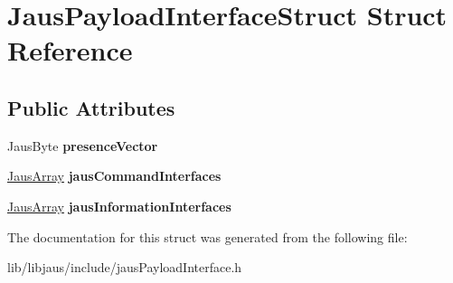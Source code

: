 \hypertarget{struct_jaus_payload_interface_struct}{\section{\-Jaus\-Payload\-Interface\-Struct \-Struct \-Reference}
\label{struct_jaus_payload_interface_struct}
}
\subsection*{\-Public \-Attributes}
\begin{DoxyCompactItemize}
\item 
\hypertarget{struct_jaus_payload_interface_struct_a78fd70aee5416cc2ffef43432e9ff16c}{\-Jaus\-Byte {\bfseries presence\-Vector}}\label{struct_jaus_payload_interface_struct_a78fd70aee5416cc2ffef43432e9ff16c}

\item 
\hypertarget{struct_jaus_payload_interface_struct_a9f2ca1e65ba68281f908d8600fa73711}{\hyperlink{struct_jaus_array_struct}{\-Jaus\-Array} {\bfseries jaus\-Command\-Interfaces}}\label{struct_jaus_payload_interface_struct_a9f2ca1e65ba68281f908d8600fa73711}

\item 
\hypertarget{struct_jaus_payload_interface_struct_a4f484d4a166507f7ebdf120f81f5a7cb}{\hyperlink{struct_jaus_array_struct}{\-Jaus\-Array} {\bfseries jaus\-Information\-Interfaces}}\label{struct_jaus_payload_interface_struct_a4f484d4a166507f7ebdf120f81f5a7cb}

\end{DoxyCompactItemize}


\-The documentation for this struct was generated from the following file\-:\begin{DoxyCompactItemize}
\item 
lib/libjaus/include/jaus\-Payload\-Interface.\-h\end{DoxyCompactItemize}
